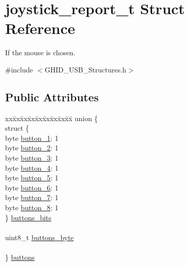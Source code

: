 \hypertarget{structjoystick__report__t}{\section{joystick\-\_\-report\-\_\-t \-Struct \-Reference}
\label{structjoystick__report__t}
}


\-If the mouse is chosen.  




{\ttfamily \#include $<$\-G\-H\-I\-D\-\_\-\-U\-S\-B\-\_\-\-Structures.\-h$>$}

\subsection*{\-Public \-Attributes}
\begin{DoxyCompactItemize}
\item 
\begin{tabbing}
xx\=xx\=xx\=xx\=xx\=xx\=xx\=xx\=xx\=\kill
union \{\\
\>struct \{\\
\>\>byte \hyperlink{structjoystick__report__t_a886edb5222b7c842f1c2f80e65cb301f}{button\_1}: 1\\
\>\>byte \hyperlink{structjoystick__report__t_af142ca63810131e6386b3bde9de28864}{button\_2}: 1\\
\>\>byte \hyperlink{structjoystick__report__t_ae2f9a864f5f3f93f8a2975542b019c81}{button\_3}: 1\\
\>\>byte \hyperlink{structjoystick__report__t_a6e6f89e0ae6bfa464e58e6cf13e58780}{button\_4}: 1\\
\>\>byte \hyperlink{structjoystick__report__t_a40d6ab0397fbb594304c624a03da1eed}{button\_5}: 1\\
\>\>byte \hyperlink{structjoystick__report__t_a962c2ec3124700193a5153f9efe862bd}{button\_6}: 1\\
\>\>byte \hyperlink{structjoystick__report__t_af93282ad1ac14cace7c2c1739b6d0998}{button\_7}: 1\\
\>\>byte \hyperlink{structjoystick__report__t_a26bd852e878a85aa8bfe428832cc8fe6}{button\_8}: 1\\
\>\} \hyperlink{structjoystick__report__t_a1bcf6f6b1266188a7075f04452dcd3e9}{buttons\_bits}\\
\>\>\\
\>uint8\_t \hyperlink{structjoystick__report__t_a1b9fb1806c80f76292cba7c719ac6c6c}{buttons\_byte}\\
\>\>\\
\} \hyperlink{structjoystick__report__t_a5a39512aea5d9e0e59ecb492aa9708f2}{buttons}\\


\end{tabbing}
\end{DoxyCompactItemize}
